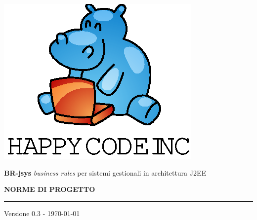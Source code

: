\documentclass[11pt,titlepage,a4paper]{report}
\begin{document}
\newcommand{\lv}{0.3 } %



\begin{titlepage}
\begin{center}
\vspace*{0.5in}
\includegraphics{logo.eps}
\vspace*{0.2in}

{\Large \textbf{BR-jsys}}
{\Large \emph{business rules} per sistemi gestionali in architettura J2EE } 
\vspace{2in}

\LARGE \textbf {NORME DI PROGETTO}
\par\rule{10cm}{0.4pt} \par {\large Versione \lv - \today}


\end{center}
\end{titlepage}
\vspace*{0.5in}
\end{document}
